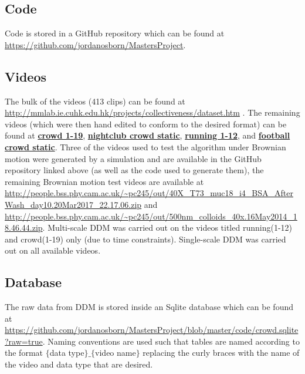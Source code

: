 \documentclass[11pt]{article}
\let\oldhref\href
\renewcommand{\href}[2]{\oldhref{#1}{\bfseries#2}}
\begin{document}
\subsection{Code}
Code is stored in a GitHub repository which can be found at \url{https://github.com/jordanosborn/MastersProject}.
\subsection{Videos}
The bulk of the videos (413 clips) can be found at \url{http://mmlab.ie.cuhk.edu.hk/projects/collectiveness/dataset.htm} \cite{crowdMotionDB}. The remaining videos (which were then hand edited to conform to the desired format) can be found at \href{https://www.youtube.com/watch?v=nrST7C_mDT8}{crowd 1-19}, \href{https://www.youtube.com/watch?v=lpEF1uyCH44}{nightclub crowd static},  \href{https://www.youtube.com/watch?v=sj2er0LPlH0}{running 1-12}, and \href{https://www.youtube.com/watch?v=AQdZ2OTF7VA}{football crowd static}. Three of the videos used to test the algorithm under Brownian motion were generated by a simulation and are available in the GitHub repository linked above (as well as the code used to generate them), the remaining Brownian motion test videos are available at \url{http://people.bss.phy.cam.ac.uk/~pc245/out/40X_T73_muc18_i4_BSA_AfterWash_day10.20Mar2017_22.17.06.zip} and \url{http://people.bss.phy.cam.ac.uk/~pc245/out/500nm_colloids_40x.16May2014_18.46.44.zip}. Multi-scale DDM was carried out on the videos titled running(1-12) and crowd(1-19) only (due to time constraints). Single-scale DDM was carried out on all available videos.
\subsection{Database}
The raw data from DDM is stored inside an Sqlite database which can be found at \url{https://github.com/jordanosborn/MastersProject/blob/master/code/crowd.sqlite?raw=true}. Naming conventions are used such that tables are named according to the format $\{$data type$\}\_\{$video name$\}$ replacing the curly braces with the name of the video and data type that are desired.
\end{document}

